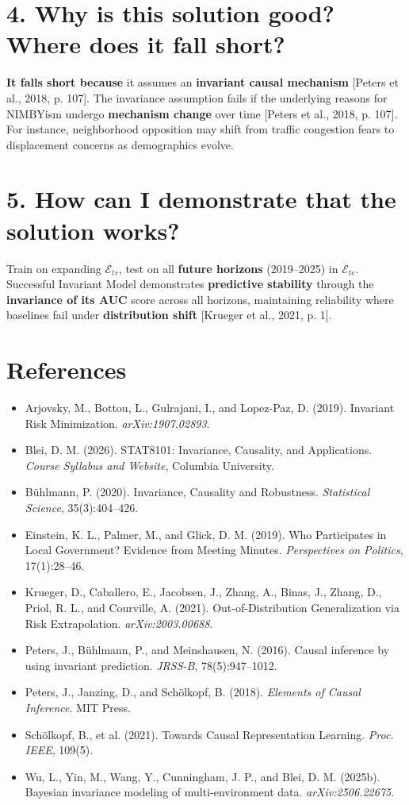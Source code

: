 \documentclass[11pt]{article}
\begin{document}
\section*{4. Why is this solution good? Where does it fall short?}
\textbf{It falls short because} it assumes an \textbf{invariant causal mechanism} [Peters et al., 2018, p. 107]. The invariance assumption fails if the underlying reasons for NIMBYism undergo \textbf{mechanism change} over time [Peters et al., 2018, p. 107]. For instance, neighborhood opposition may shift from traffic congestion fears to displacement concerns as demographics evolve.

\section*{5. How can I demonstrate that the solution works?}
Train on expanding $\mathcal{E}_{tr}$, test on all \textbf{future horizons} (2019--2025) in $\mathcal{E}_{te}$. Successful Invariant Model demonstrates \textbf{predictive stability} through the \textbf{invariance of its AUC} score across all horizons, maintaining reliability where baselines fail under \textbf{distribution shift} [Krueger et al., 2021, p. 1].

\section*{References}
\scriptsize
\setlength{\parskip}{0pt}
\begin{itemize}
    \setlength\itemsep{0em}
    \item Arjovsky, M., Bottou, L., Gulrajani, I., and Lopez-Paz, D. (2019). Invariant Risk Minimization. \textit{arXiv:1907.02893}.
    \item Blei, D. M. (2026). STAT8101: Invariance, Causality, and Applications. \textit{Course Syllabus and Website}, Columbia University.
    \item Bühlmann, P. (2020). Invariance, Causality and Robustness. \textit{Statistical Science}, 35(3):404--426.
    \item Einstein, K. L., Palmer, M., and Glick, D. M. (2019). Who Participates in Local Government? Evidence from Meeting Minutes. \textit{Perspectives on Politics}, 17(1):28--46.
    \item Krueger, D., Caballero, E., Jacobsen, J., Zhang, A., Binas, J., Zhang, D., Priol, R. L., and Courville, A. (2021). Out-of-Distribution Generalization via Risk Extrapolation. \textit{arXiv:2003.00688}.
    \item Peters, J., Bühlmann, P., and Meinshausen, N. (2016). Causal inference by using invariant prediction. \textit{JRSS-B}, 78(5):947--1012.
    \item Peters, J., Janzing, D., and Schölkopf, B. (2018). \textit{Elements of Causal Inference}. MIT Press.
    \item Schölkopf, B., et al. (2021). Towards Causal Representation Learning. \textit{Proc. IEEE}, 109(5).
    \item Wu, L., Yin, M., Wang, Y., Cunningham, J. P., and Blei, D. M. (2025b). Bayesian invariance modeling of multi-environment data. \textit{arXiv:2506.22675}.
\end{itemize}
\end{document}
